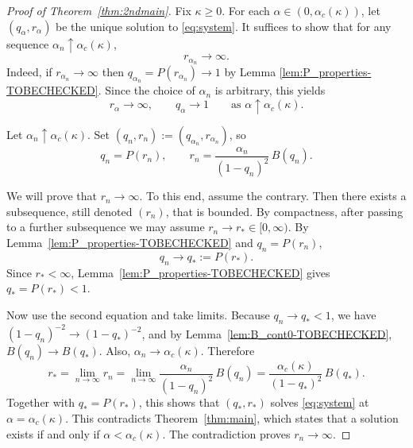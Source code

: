 \documentclass[11pt]{article}
\begin{document}
\begin{proof}[{Proof of Theorem~\ref{thm:2ndmain}}]

Fix $\kappa\geq 0$. For each $\alpha\in(0,\alpha_c(\kappa))$, let $(q_\alpha,r_\alpha)$ be the unique
solution to \eqref{eq:system}. It suffices to show that for any sequence
$\alpha_n\uparrow\alpha_c(\kappa)$,
\[
r_{\alpha_n}\to\infty.
\]
Indeed, if $r_{\alpha_n}\to\infty$ then $q_{\alpha_n}=P(r_{\alpha_n})\to 1$ by Lemma
\ref{lem:P_properties-TOBECHECKED}. Since the choice of $\alpha_n$ is arbitrary, this yields
\[
r_\alpha\to\infty,\qquad q_\alpha\to 1\qquad\text{as }\alpha\uparrow\alpha_c(\kappa).
\]

Let $\alpha_n\uparrow \alpha_c(\kappa)$. Set $(q_n,r_n):=(q_{\alpha_n},r_{\alpha_n})$, so
\[
q_n=P(r_n),\qquad r_n=\frac{\alpha_n}{(1-q_n)^2}\,B(q_n).
\]

We will prove that $r_n\to\infty$. To this end, assume the contrary. Then there exists a subsequence, still denoted $(r_n)$, that is bounded.
By compactness, after passing to a further subsequence we may assume $r_n\to r_*\in[0,\infty)$.
By Lemma~\ref{lem:P_properties-TOBECHECKED} and $q_n=P(r_n)$,
\[
q_n\to q_*:=P(r_*).
\]
Since $r_*<\infty$, Lemma~\ref{lem:P_properties-TOBECHECKED} gives $q_*=P(r_*)<1$.

Now use the second equation and take limits. Because $q_n\to q_*<1$, we have
$(1-q_n)^{-2}\to(1-q_*)^{-2}$, and by Lemma~\ref{lem:B_cont0-TOBECHECKED},
$B(q_n)\to B(q_*)$. Also, $\alpha_n\to\alpha_c(\kappa)$. Therefore
\[
r_*=\lim_{n\to\infty} r_n
=\lim_{n\to\infty}\frac{\alpha_n}{(1-q_n)^2}\,B(q_n)
=\frac{\alpha_c(\kappa)}{(1-q_*)^2}\,B(q_*).
\]
Together with $q_*=P(r_*)$, this shows that $(q_*,r_*)$ solves \eqref{eq:system} at
$\alpha=\alpha_c(\kappa)$. This contradicts Theorem~\ref{thm:main}, which states that a solution
exists if and only if $\alpha<\alpha_c(\kappa)$. The contradiction proves $r_n\to\infty$.
\end{proof}
\end{document}
